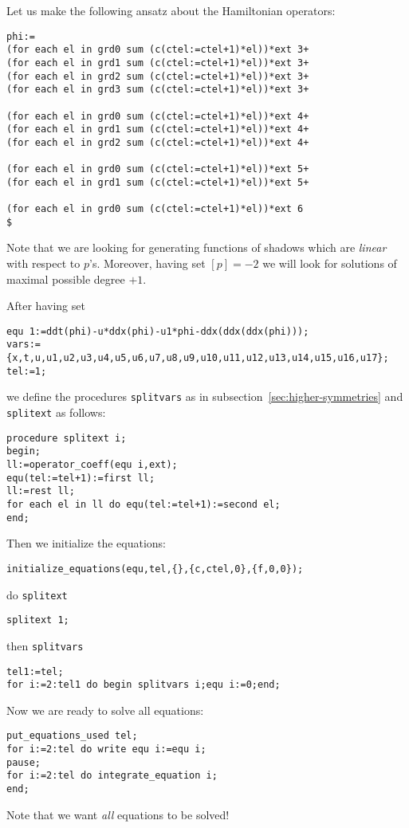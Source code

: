 \documentclass[12pt]{amsart}
\theoremstyle{definition}
\begin{document}
Let us make the following ansatz about the Hamiltonian operators:
\begin{verbatim}
phi:=
(for each el in grd0 sum (c(ctel:=ctel+1)*el))*ext 3+
(for each el in grd1 sum (c(ctel:=ctel+1)*el))*ext 3+
(for each el in grd2 sum (c(ctel:=ctel+1)*el))*ext 3+
(for each el in grd3 sum (c(ctel:=ctel+1)*el))*ext 3+

(for each el in grd0 sum (c(ctel:=ctel+1)*el))*ext 4+
(for each el in grd1 sum (c(ctel:=ctel+1)*el))*ext 4+
(for each el in grd2 sum (c(ctel:=ctel+1)*el))*ext 4+

(for each el in grd0 sum (c(ctel:=ctel+1)*el))*ext 5+
(for each el in grd1 sum (c(ctel:=ctel+1)*el))*ext 5+

(for each el in grd0 sum (c(ctel:=ctel+1)*el))*ext 6
$
\end{verbatim}
Note that we are looking for generating functions of shadows which are
\emph{linear} with respect to $p$'s. Moreover, having set $[p]=-2$ we will look
for solutions of maximal possible degree $+1$.

After having set
\begin{verbatim}
equ 1:=ddt(phi)-u*ddx(phi)-u1*phi-ddx(ddx(ddx(phi)));
vars:={x,t,u,u1,u2,u3,u4,u5,u6,u7,u8,u9,u10,u11,u12,u13,u14,u15,u16,u17};
tel:=1;
\end{verbatim}
we define the procedures \texttt{splitvars} as in
subsection~\ref{sec:higher-symmetries} and \texttt{splitext} as follows:
\begin{verbatim}
procedure splitext i;
begin;
ll:=operator_coeff(equ i,ext);
equ(tel:=tel+1):=first ll;
ll:=rest ll;
for each el in ll do equ(tel:=tel+1):=second el;
end;
\end{verbatim}
Then we initialize the equations:
\begin{verbatim}
initialize_equations(equ,tel,{},{c,ctel,0},{f,0,0});
\end{verbatim}
do \texttt{splitext}
\begin{verbatim}
splitext 1;
\end{verbatim}
then \texttt{splitvars}
\begin{verbatim}
tel1:=tel;
for i:=2:tel1 do begin splitvars i;equ i:=0;end;
\end{verbatim}
Now we are ready to solve all equations:
\begin{verbatim}
put_equations_used tel;
for i:=2:tel do write equ i:=equ i;
pause;
for i:=2:tel do integrate_equation i;
end;
\end{verbatim}
Note that we want \emph{all} equations to be solved!
\end{document}
